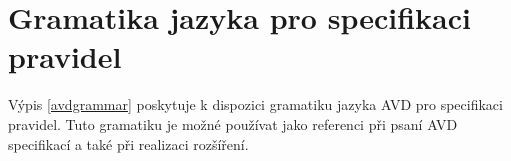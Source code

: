 \section{Gramatika jazyka pro specifikaci pravidel}
\label{avd_grammar}
Výpis \ref{avdgrammar} poskytuje k dispozici gramatiku jazyka AVD pro specifikaci pravidel. Tuto gramatiku je možné používat jako referenci při psaní AVD specifikací a také při realizaci rozšíření.


